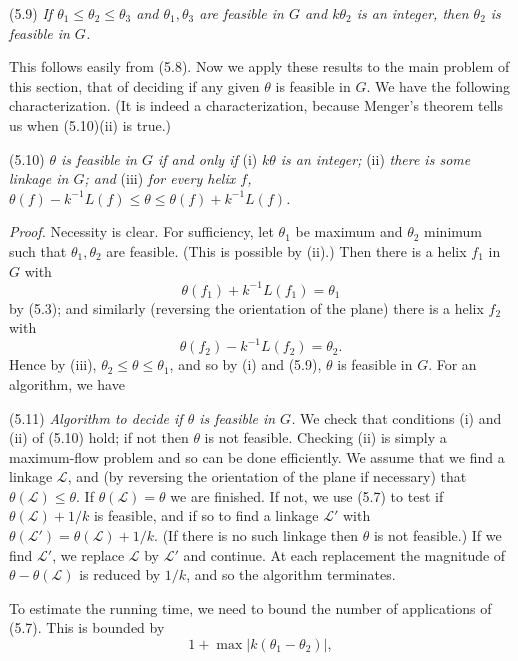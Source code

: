 \stmt
(5.9) \textit{If $\theta_1 \le \theta_2 \le \theta_3$ and $\theta_1, \theta_3$ are feasible in $G$ and $k\theta_2$ is an integer, then $\theta_2$ is feasible in $G$.}

This follows easily from (5.8). Now we apply these results to the main problem of this section, that of deciding if any given $\theta$ is feasible in $G$. We have the following characterization. (It is indeed a characterization, because Menger's theorem tells us when (5.10)(ii) is true.)

\stmt
(5.10) \textit{$\theta$ is feasible in $G$ if and only if} (i) \textit{$k\theta$ is an integer;} (ii) \textit{there is some linkage in $G$; and} (iii) \textit{for every helix $f$, $\theta(f) - k^{-1}L(f) \le \theta \le \theta(f) + k^{-1}L(f)$.}

\textit{Proof.} Necessity is clear. For sufficiency, let $\theta_1$ be maximum and $\theta_2$ minimum such that $\theta_1, \theta_2$ are feasible. (This is possible by (ii).) Then there is a helix $f_1$ in $G$ with
\begin{equation*}
\theta(f_1) + k^{-1}L(f_1) = \theta_1
\end{equation*}
by (5.3); and similarly (reversing the orientation of the plane) there is a helix $f_2$ with
\begin{equation*}
\theta(f_2) - k^{-1}L(f_2) = \theta_2.
\end{equation*}
Hence by (iii), $\theta_2 \le \theta \le \theta_1$, and so by (i) and (5.9), $\theta$ is feasible in $G$. For an algorithm, we have

\stmt
(5.11) \textit{Algorithm to decide if $\theta$ is feasible in $G$.} We check that conditions (i) and (ii) of (5.10) hold; if not then $\theta$ is not feasible. Checking (ii) is simply a maximum-flow problem and so can be done efficiently. We assume that we find a linkage $\mathscr{L}$, and (by reversing the orientation of the plane if necessary) that $\theta(\mathscr{L}) \le \theta$. If $\theta(\mathscr{L}) = \theta$ we are finished. If not, we use (5.7) to test if $\theta(\mathscr{L}) + 1/k$ is feasible, and if so to find a linkage $\mathscr{L}'$ with $\theta(\mathscr{L}') = \theta(\mathscr{L}) + 1/k$. (If there is no such linkage then $\theta$ is not feasible.) If we find $\mathscr{L}'$, we replace $\mathscr{L}$ by $\mathscr{L}'$ and continue. At each replacement the magnitude of $\theta - \theta(\mathscr{L})$ is reduced by $1/k$, and so the algorithm terminates.

To estimate the running time, we need to bound the number of applications of (5.7). This is bounded by
\begin{equation*}
1 + \max |k(\theta_1 - \theta_2)|,
\end{equation*}
